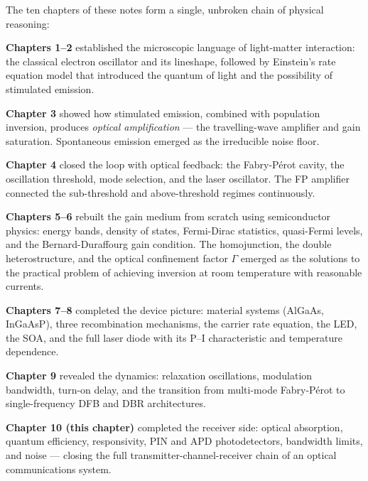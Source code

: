 \begin{keyinsight}
    The ten chapters of these notes form a single, unbroken chain of physical reasoning:

    \textbf{Chapters 1--2} established the microscopic language of light-matter interaction: the classical electron oscillator and its lineshape, followed by Einstein's rate equation model that introduced the quantum of light and the possibility of stimulated emission.

    \textbf{Chapter 3} showed how stimulated emission, combined with population inversion, produces \emph{optical amplification} — the travelling-wave amplifier and gain saturation. Spontaneous emission emerged as the irreducible noise floor.

    \textbf{Chapter 4} closed the loop with optical feedback: the Fabry-Pérot cavity, the oscillation threshold, mode selection, and the laser oscillator. The FP amplifier connected the sub-threshold and above-threshold regimes continuously.

    \textbf{Chapters 5--6} rebuilt the gain medium from scratch using semiconductor physics: energy bands, density of states, Fermi-Dirac statistics, quasi-Fermi levels, and the Bernard-Duraffourg gain condition. The homojunction, the double heterostructure, and the optical confinement factor $\Gamma$ emerged as the solutions to the practical problem of achieving inversion at room temperature with reasonable currents.

    \textbf{Chapters 7--8} completed the device picture: material systems (AlGaAs, InGaAsP), three recombination mechanisms, the carrier rate equation, the LED, the SOA, and the full laser diode with its P--I characteristic and temperature dependence.

    \textbf{Chapter 9} revealed the dynamics: relaxation oscillations, modulation bandwidth, turn-on delay, and the transition from multi-mode Fabry-Pérot to single-frequency DFB and DBR architectures.

    \textbf{Chapter 10 (this chapter)} completed the receiver side: optical absorption, quantum efficiency, responsivity, PIN and APD photodetectors, bandwidth limits, and noise — closing the full transmitter-channel-receiver chain of an optical communications system.


\end{keyinsight}
